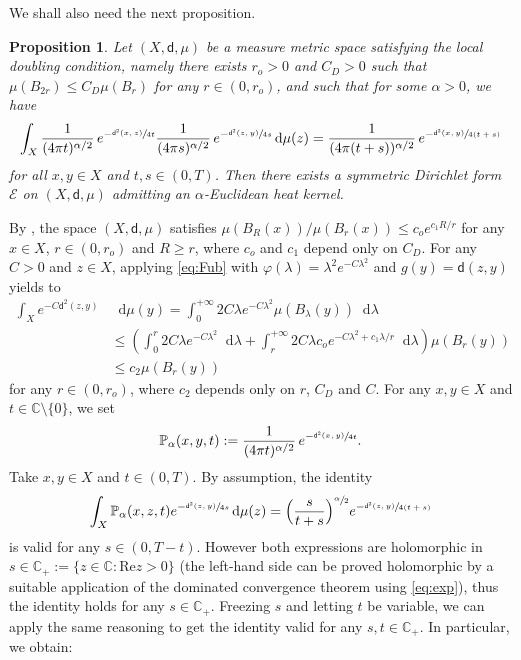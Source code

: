 \documentclass[JEP,XML,SOM,Unicode,published]{cedram}
\let\sep:
\theoremstyle{plain}
\newtheorem{proposition}[theorem]{Proposition}
\theoremstyle{definition}
\newcommand{\setC}{\mathbb{C}}
\newcommand{\bP}{\mathbb{P}}
\newcommand{\cE}{\mathcal{E}}
\let\phi\varphi
\newcommand{\di}{\mathop{}\!\mathrm{d}}
\newcommand{\dist}{\mathsf{d}}
\begin{document}
We shall also need the next proposition.
\begin{proposition}\label{prop:5.3} Let $(X,\dist,\mu)$ be a measure metric space satisfying the local doubling condition, namely there exists $r_o>0$ and $C_D>0$ such that $\mu(B_{2r}) \le C_D \mu(B_r)$ for any $r \in (0,r_o)$, and such that for some $\alpha >0$, we have
\[
\int_X \frac{1}{(4 \pi t)^{\alpha/2}}\, e^{-\sfrac{\dist^2(x,z)}{4t}}\frac{1}{(4 \pi s)^{\alpha/2}}\, e^{-\sfrac{\dist^2(z,y)}{4s}} \di \mu(z)=\frac{1}{(4 \pi (t+s))^{\alpha/2}}\, e^{-\sfrac{\dist^2(x,y)}{4(t+s)}}
\]
for all $x,y \in X$ and $t,s \in (0,T)$. Then there exists a symmetric Dirichlet form $\cE$ on $(X,\dist,\mu)$ admitting an $\alpha$-Euclidean heat kernel.
\end{proposition}
\proof By \cite[Lem.\,3.9]{Carron}, the space $(X,\dist,\mu)$ satisfies $
\mu(B_R(x))/\mu(B_r(x)) \le c_o e^{c_1 R/r}$ for any $x \in X$, $r\in(0,r_o)$ and $R\ge r$, where $c_o$ and $c_1$ depend only on $C_D$. For any $C>0$ and $z \in X$, applying \eqref{eq:Fub} with $\phi(\lambda)=\lambda^2 e^{-C\lambda^2}$ and $g(y)=\dist(z,y)$ yields to
\begin{equation}
\begin{aligned}\label{eq:exp}
\int_X e^{-C\dist^2(z,y)}&\di \mu(y) = \int_0^{+\infty} 2 C \lambda e^{-C\lambda^2} \mu(B_\lambda(y))\di \lambda \\
& \le \left(\int_0^r 2 C \lambda e^{-C\lambda^2} \di \lambda + \int_r^{+\infty} 2 C \lambda c_o e^{-C\lambda^2 + c_1 \lambda/r} \di \lambda\right)\mu(B_r(y)) \\
& \le c_2 \mu(B_r(y))
\end{aligned}
\end{equation}
for any $r \in(0,r_o)$, where $c_2$ depends only on $r$, $C_D$ and $C$. For any $x,y\in X$ and $t\in \setC\setminus \{0\}$,
we set
\[
\bP_\alpha(x,y,t):=\frac{1}{(4 \pi t)^{\alpha/2}}\, e^{-\sfrac{\dist^2(x,y)}{4t}}.
\]
Take $x,y \in X$ and $t\in(0,T)$. By assumption, the identity
\[
\int_X \bP_\alpha(x,z,t)e^{-\sfrac{\dist^2(z,y)}{4s}}\di \mu(z)= \Bigl(\frac{s}{t+s}\Bigr)^{\sfrac \alpha2}e^{-\sfrac{\dist^2(z,y)}{4(t+s)}}
\]
is valid for any $s \in (0,T-t)$. However both expressions are holomorphic in $s\in \setC_+:=\{z\in \setC\sep \mathrm{Re} z>0\}$ (the left-hand side can be proved holomorphic by a suitable application of the dominated convergence theorem using \eqref{eq:exp}), thus the identity holds for any $s\in \setC_+$. Freezing $s$ and letting $t$ be variable, we can apply the same reasoning to get the identity valid for any $s, t \in \setC_+$. In particular, we obtain:
\end{document}
